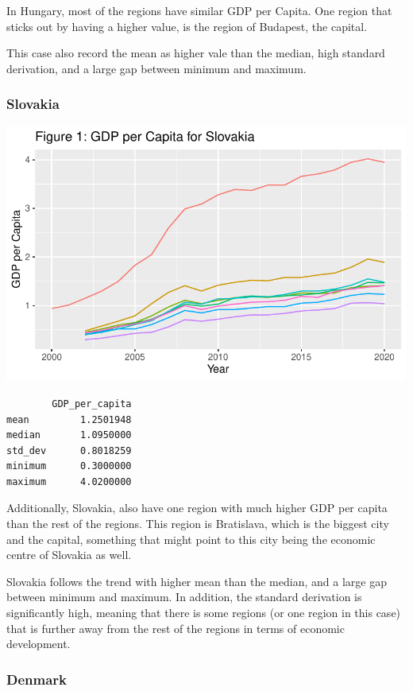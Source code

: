\documentclass[
  a4paper,
  DIV=11,
  numbers=noendperiod]{scrartcl}
\begin{document}
In Hungary, most of the regions have similar GDP per Capita. One region
that sticks out by having a higher value, is the region of Budapest, the
capital.

This case also record the mean as higher vale than the median, high
standard derivation, and a large gap between minimum and maximum.

\hypertarget{slovakia}{%
\subsubsection{Slovakia}\label{slovakia}}

\includegraphics{MSB104_GR_1_Final_Assignment_research_article_files/figure-pdf/unnamed-chunk-16-1.pdf}

\begin{verbatim}
        GDP_per_capita
mean         1.2501948
median       1.0950000
std_dev      0.8018259
minimum      0.3000000
maximum      4.0200000
\end{verbatim}

Additionally, Slovakia, also have one region with much higher GDP per
capita than the rest of the regions. This region is Bratislava, which is
the biggest city and the capital, something that might point to this
city being the economic centre of Slovakia as well.

Slovakia follows the trend with higher mean than the median, and a large
gap between minimum and maximum. In addition, the standard derivation is
significantly high, meaning that there is some regions (or one region in
this case) that is further away from the rest of the regions in terms of
economic development.

\hypertarget{denmark}{%
\subsubsection{Denmark}\label{denmark}}
\end{document}
